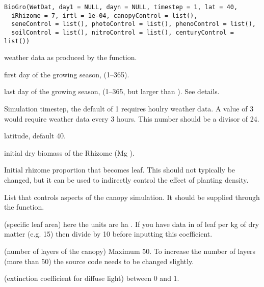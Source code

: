 \documentclass[letterpaper]{book}
\begin{document}
%
\begin{Usage}
\begin{verbatim}
BioGro(WetDat, day1 = NULL, dayn = NULL, timestep = 1, lat = 40,
  iRhizome = 7, irtl = 1e-04, canopyControl = list(),
  seneControl = list(), photoControl = list(), phenoControl = list(),
  soilControl = list(), nitroControl = list(), centuryControl = list())
\end{verbatim}
\end{Usage}
%
\begin{Arguments}
\begin{ldescription}
\item[\code{WetDat}] weather data as produced by the
 function.

\item[\code{day1}] first day of the growing season, (1--365).

\item[\code{dayn}] last day of the growing season, (1--365, but
larger than ). See details.

\item[\code{timestep}] Simulation timestep, the default of 1
requires houlry weather data. A value of 3 would require
weather data every 3 hours.  This number should be a
divisor of 24.

\item[\code{lat}] latitude, default 40.

\item[\code{iRhizome}] initial dry biomass of the Rhizome (Mg
).

\item[\code{irtl}] Initial rhizome proportion that becomes leaf.
This should not typically be changed, but it can be used
to indirectly control the effect of planting density.

\item[\code{canopyControl}] List that controls aspects of the
canopy simulation. It should be supplied through the
 function.

 (specific leaf area) here the units are ha
.  If you have data in  of leaf per
kg of dry matter (e.g. 15) then divide by 10 before
inputting this coefficient.

 (number of layers of the canopy) Maximum
50. To increase the number of layers (more than 50) the
 source code needs to be changed slightly.

 (extinction coefficient for diffuse light)
between 0 and 1.


\end{ldescription}
\end{Arguments}
\end{document}
